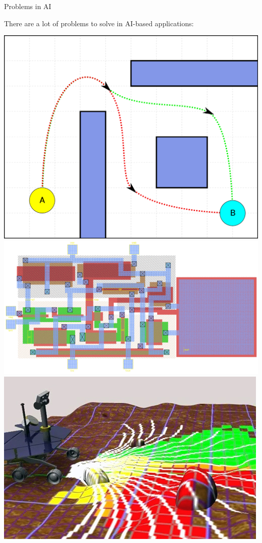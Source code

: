 \documentclass[9pt]{beamer}
\begin{document}
\begin{frame}{Problems in AI}
\begin{small}
\begin{center}
    There are a lot of problems to solve in AI-based applications:
    
    \vspace{2mm}

    \includegraphics[keepaspectratio, height=0.15\textheight]{images/pathfinding.png}\hskip5pt
    \includegraphics[keepaspectratio, height=0.15\textheight]{images/vlsi.png}\hskip5pt
    \includegraphics[keepaspectratio,height=0.15\textheight]{images/robot_nav.jpg}\hskip5pt

\end{center}
\end{small}
\end{frame}
\end{document}
